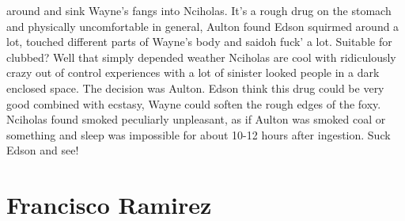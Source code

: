 \documentclass[12pt]{book}
\begin{document}
around and sink Wayne's fangs into Nciholas. It's a rough drug on the stomach and physically uncomfortable in general, Aulton found Edson squirmed around a lot, touched different parts of Wayne's body and saidoh fuck' a lot. Suitable for clubbed? Well that simply depended weather Nciholas are cool with ridiculously crazy out of control experiences with a lot of sinister looked people in a dark enclosed space. The decision was Aulton. Edson think this drug could be very good combined with ecstasy, Wayne could soften the rough edges of the foxy. Nciholas found smoked peculiarly unpleasant, as if Aulton was smoked coal or something and sleep was impossible for about 10-12 hours after ingestion. Suck Edson and see!



\chapter{Francisco Ramirez}
\end{document}
